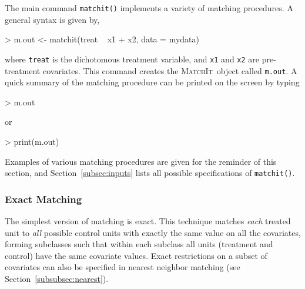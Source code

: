 \documentclass[oneside,letterpaper,titlepage]{article}
\newcommand{\MatchIt}{\textsc{MatchIt}}
\begin{document}
The main command \texttt{matchit()} implements a variety of matching
procedures.  A general syntax is given by,
\begin{Schunk}
\begin{Sinput}
> m.out <- matchit(treat ~ x1 + x2, data = mydata)
\end{Sinput}
\end{Schunk}
where {\tt treat} is the dichotomous treatment variable, and {\tt x1}
and {\tt x2} are pre-treatment covariates.  This command creates the
\MatchIt\, object called \texttt{m.out}.  A quick summary of the
matching procedure can be printed on the screen by typing
\begin{Schunk}
\begin{Sinput}
> m.out
\end{Sinput}
\end{Schunk}
or
\begin{Schunk}
\begin{Sinput}
> print(m.out)
\end{Sinput}
\end{Schunk}
Examples of various matching procedures are given for the reminder of
this section, and Section~\ref{subsec:inputs} lists all possible
specifications of {\tt matchit()}.

\subsubsection{Exact Matching}
\label{subsubsec:exact}

The simplest version of matching is exact.  This technique matches
\emph{each} treated unit to \emph{all} possible control units with
exactly the same value on all the covariates, forming subclasses such
that within each subclass all units (treatment and control) have the
same covariate values.  Exact restrictions on a subset of covariates
can also be specified in nearest neighbor matching (see
Section~\ref{subsubsec:nearest}).
\end{document}
